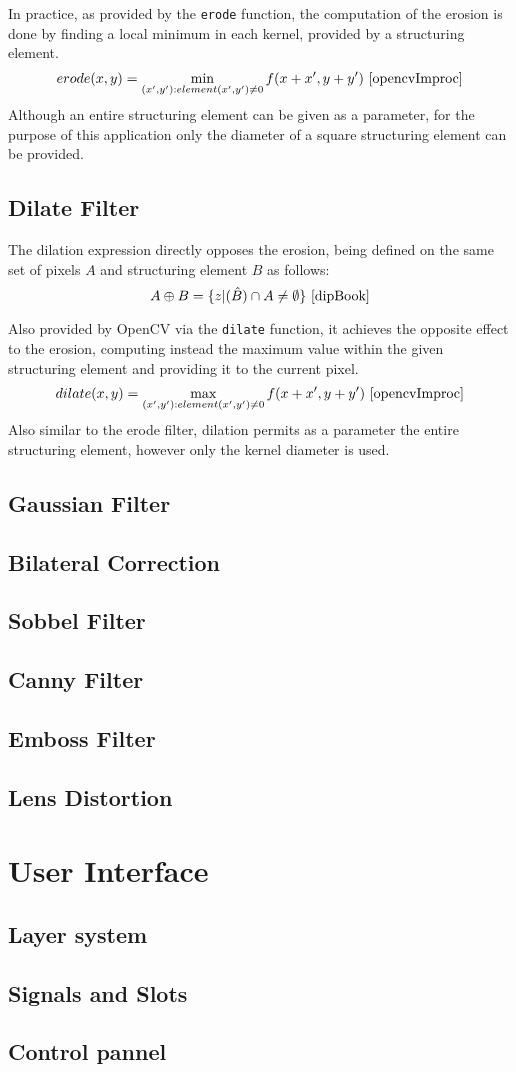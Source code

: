 In practice, as provided by the \verb|erode| function, the computation of the erosion is done by finding a
local minimum in each kernel, provided by a structuring element.
\[erode(x, y) = \min\limits_{(x', y'): element(x', y') \neq 0} f(x + x', y + y')\text{ \cite{opencvImproc}}\]
Although an entire structuring element can be given as a parameter, for the purpose of this application only
the diameter of a square structuring element can be provided.

\subsection{Dilate Filter}

The dilation expression directly opposes the erosion, being defined on the same set of pixels \(A\) and
structuring element \(B\) as follows: 
\[A \oplus B = \{z | (\hat{B}) \cap A \neq \emptyset\}\text{ \cite{dipBook}}\]

Also provided by OpenCV via the \verb|dilate| function, it achieves the opposite effect to the erosion,
computing instead the maximum value within the given structuring element and providing it to the current
pixel. 
\[dilate(x, y) = \max\limits_{(x', y'): element(x', y') \neq 0} f(x + x', y + y')\text{ \cite{opencvImproc}}\]
Also similar to the erode filter, dilation permits as a parameter the entire structuring element, however
only the kernel diameter is used.

\subsection{Gaussian Filter}
\subsection{Bilateral Correction}
\subsection{Sobbel Filter}
\subsection{Canny Filter}
\subsection{Emboss Filter}
\subsection{Lens Distortion}

\section{User Interface}

\subsection{Layer system}

\subsection{Signals and Slots}

\subsection{Control pannel}





